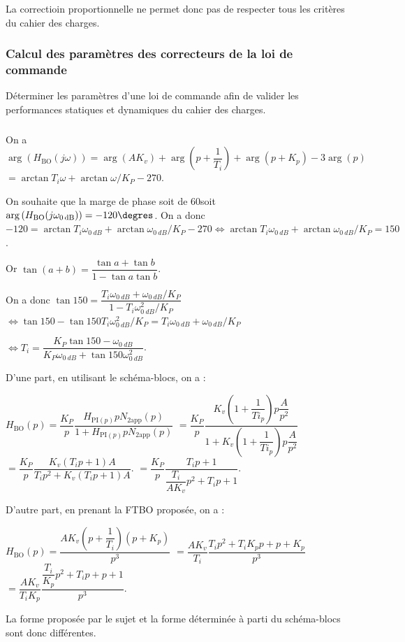 \documentclass[10pt,fleqn]{article} %
\begin{document}
La correctioin proportionnelle ne permet donc pas de respecter tous les critères du cahier des charges.

\subsubsection{Calcul des paramètres des correcteurs de la loi de commande}

\begin{obj}
Déterminer les paramètres d’une loi de commande afin de valider les performances statiques et dynamiques du cahier des charges.
\end{obj}

\subparagraph{} %
On a $\arg \left(H_{\text{BO}}(j\omega)\right)=\arg\left(AK_v \right) + \arg\left(p+\dfrac{1}{T_i}\right) + \arg\left(p+K_p\right)-3 \arg(p)$
$ =\arctan T_i\omega +\arctan\omega/K_P -270$.

On souhaite que la marge de phase soit de 60\degres soit 
$\arg \left(H_{\text{BO}}(j\omega_{\SI{0}{dB}})\right)=-120\degres$. 
On a donc 
$-120=\arctan T_i\omega_{\SI{0}{dB}} +\arctan\omega_{\SI{0}{dB}}/K_P -270 \Leftrightarrow \arctan T_i\omega_{\SI{0}{dB}} +\arctan\omega_{\SI{0}{dB}}/K_P = 150$.

Or $\tan(a+b)=\dfrac{\tan a + \tan b}{1-\tan a\tan b}$. 

On a donc $\tan 150 = \dfrac{T_i\omega_{\SI{0}{dB}} + \omega_{\SI{0}{dB}}/K_P}{1-T_i\omega_{\SI{0}{dB}}^2/K_P}$
$ \Leftrightarrow \tan 150 -\tan 150 T_i\omega_{\SI{0}{dB}}^2/K_P= T_i\omega_{\SI{0}{dB}} + \omega_{\SI{0}{dB}}/K_P $

$ \Leftrightarrow  T_i  = \dfrac{K_P\tan 150 - \omega_{\SI{0}{dB}}}{K_P\omega_{\SI{0}{dB}}+\tan 150 \omega_{\SI{0}{dB}}^2}$.


\begin{rem} D'une part, en utilisant le schéma-blocs, on a :

$H_{\text{BO}}(p)=\dfrac{K_P}{p}\dfrac{H_{\text{PI}(p)}pN_{\text{2app}}(p)}{1+H_{\text{PI}(p)}pN_{\text{2app}}(p)}$
$=\dfrac{K_P}{p}\dfrac{K_v\left(1+\dfrac{1}{Ti_ p} \right)p\dfrac{A}{p^2}}{1+K_v\left(1+\dfrac{1}{Ti_ p} \right)p\dfrac{A}{p^2}}$
$=\dfrac{K_P}{p}\dfrac{K_v\left(T_i p+1 \right){A}}{T_i p^2+K_v\left(T_i p+1 \right){A}}$.
$=\dfrac{K_P}{p}\dfrac{T_i p+1}{\dfrac{T_i}{AK_v} p^2+ T_i p+1 }$.

D'autre part, en prenant la FTBO proposée, on a : 

$H_{\text{BO}}(p)=\dfrac{AK_v\left(p+\dfrac{1}{T_i} \right)\left(p+K_p\right)}{p^3}$
$=\dfrac{AK_v}{T_i}\dfrac{T_ip^2+T_iK_pp+p+K_p }{p^3}$
$=\dfrac{AK_v}{T_iK_p}\dfrac{\dfrac{T_i}{K_p}p^2+T_ip+p+1 }{p^3}$.

La forme proposée par le sujet et la forme déterminée à parti du schéma-blocs sont donc différentes. 

\end{rem}
\end{document}

